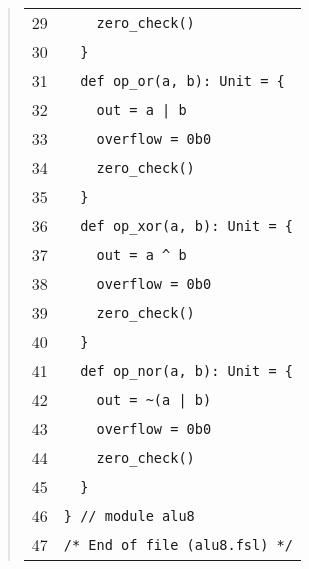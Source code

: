 \begin{quote}
\begin{tabular}{r|l}
   29 & \verb|    zero_check()| \\ [-3pt]
   30 & \verb|  }| \\ [-3pt]
   31 & \verb|  def op_or(a, b): Unit = {| \\ [-3pt]
   32 & \verb+    out = a | b+ \\ [-3pt]
   33 & \verb|    overflow = 0b0| \\ [-3pt]
   34 & \verb|    zero_check()| \\ [-3pt]
   35 & \verb|  }| \\ [-3pt]
   36 & \verb|  def op_xor(a, b): Unit = {| \\ [-3pt]
   37 & \verb|    out = a ^ b| \\ [-3pt]
   38 & \verb|    overflow = 0b0| \\ [-3pt]
   39 & \verb|    zero_check()| \\ [-3pt]
   40 & \verb|  }| \\ [-3pt]
   41 & \verb|  def op_nor(a, b): Unit = {| \\ [-3pt]
   42 & \verb+    out = ~(a | b)+ \\ [-3pt]
   43 & \verb|    overflow = 0b0| \\ [-3pt]
   44 & \verb|    zero_check()| \\ [-3pt]
   45 & \verb|  }| \\ [-3pt]
   46 & \verb|} // module alu8| \\ [-3pt]
   47 & \verb|/* End of file (alu8.fsl) */| \\ [-3pt]
\end{tabular}
\end{quote}
